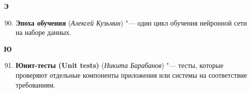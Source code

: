 \begin{flushleft} \large\textbf{Э} \end{flushleft}

\begin{enumerate}
    \setcounter{enumi}{89}

    \item \textbf{Эпоха обучения} (\textit{Алексей Кузьмин}) "--- 
    один цикл обучения нейронной сети на наборе данных. 
\end{enumerate}

\begin{flushleft} \large\textbf{Ю} \end{flushleft}

\begin{enumerate}
    \setcounter{enumi}{90}

    \item \textbf{Юнит-тесты (Unit tests)} (\textit{Никита Барабанов}) "--- 
    тесты, которые проверяют отдельные компоненты приложения или системы на соответствие требованиям. 
\end{enumerate}